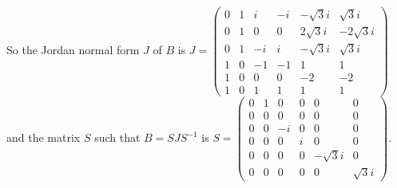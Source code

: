 \documentclass[a4paper,12pt,titlepage]{article}
\begin{document}
So the Jordan normal form $J$ of $B$ is $J=\begin{pmatrix}
0 &1& i&-i & -\sqrt{3}i&\sqrt{3}i\\
0 &1& 0& 0 &2\sqrt{3}i&-2\sqrt{3}i\\
0 &1&-i& i & -\sqrt{3}i&\sqrt{3}i\\
1 &0&-1&-1 &1&1\\
1 &0& 0& 0 &-2&-2\\
1 &0& 1& 1 &1&1
\end{pmatrix}$ and the matrix $S$ such that $B=SJS^{-1}$ is $S=\begin{pmatrix}
0&1&0&0&0&0\\
0&0&0&0&0&0\\
0&0&-i&0&0&0\\
0&0&0&i&0&0\\
0&0&0&0&-\sqrt{3}i&0\\
0&0&0&0&0&\sqrt{3}i
\end{pmatrix}$. 
\end{document}
